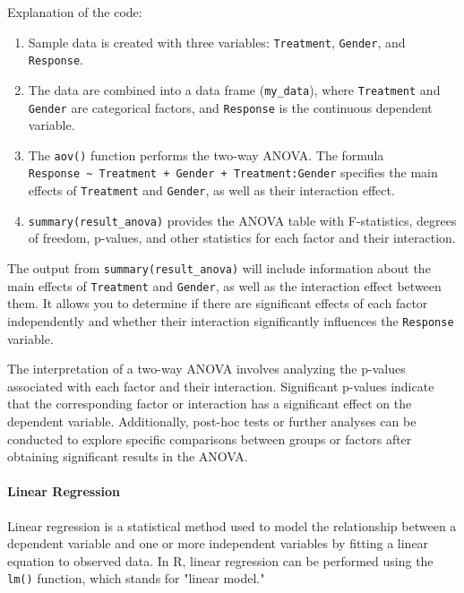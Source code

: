 \documentclass[
]{article}
\begin{document}
Explanation of the code:

\begin{enumerate}
\def\labelenumi{\arabic{enumi}.}
\item
  Sample data is created with three variables: \texttt{Treatment},
  \texttt{Gender}, and \texttt{Response}.
\item
  The data are combined into a data frame (\texttt{my\_data}), where
  \texttt{Treatment} and \texttt{Gender} are categorical factors, and
  \texttt{Response} is the continuous dependent variable.
\item
  The \texttt{aov()} function performs the two-way ANOVA. The formula
  \texttt{Response\ \textasciitilde{}\ Treatment\ +\ Gender\ +\ Treatment:Gender}
  specifies the main effects of \texttt{Treatment} and \texttt{Gender},
  as well as their interaction effect.
\item
  \texttt{summary(result\_anova)} provides the ANOVA table with
  F-statistics, degrees of freedom, p-values, and other statistics for
  each factor and their interaction.
\end{enumerate}

The output from \texttt{summary(result\_anova)} will include information
about the main effects of \texttt{Treatment} and \texttt{Gender}, as
well as the interaction effect between them. It allows you to determine
if there are significant effects of each factor independently and
whether their interaction significantly influences the \texttt{Response}
variable.

The interpretation of a two-way ANOVA involves analyzing the p-values
associated with each factor and their interaction. Significant p-values
indicate that the corresponding factor or interaction has a significant
effect on the dependent variable. Additionally, post-hoc tests or
further analyses can be conducted to explore specific comparisons
between groups or factors after obtaining significant results in the
ANOVA.

\hypertarget{linear-regression}{%
\paragraph{Linear Regression}\label{linear-regression}}

Linear regression is a statistical method used to model the relationship
between a dependent variable and one or more independent variables by
fitting a linear equation to observed data. In R, linear regression can
be performed using the \texttt{lm()} function, which stands for "linear
model."
\end{document}
